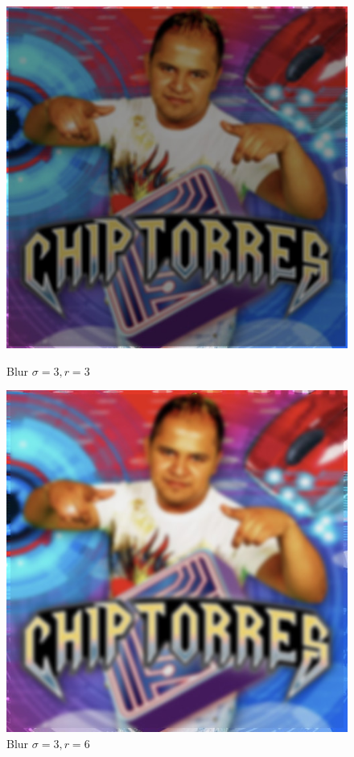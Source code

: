 \begin{figure}[H]
\begin{minipage}{.3\textwidth}
		\includegraphics[width=\linewidth]{imgs/blur_s3_r3.jpg}
		\caption{Blur  $\sigma = 3, r = 3$}
		\label{fig:blur_s3_r3}
	\end{minipage}\hfill
	\begin{minipage}{.3\textwidth}
		\centering
		\includegraphics[width=\linewidth]{imgs/blur_s3_r6.jpg}
		\caption{Blur $\sigma = 3, r = 6$}
		\label{fig:blur_s3_r6}
	\end{minipage}
\end{figure}



